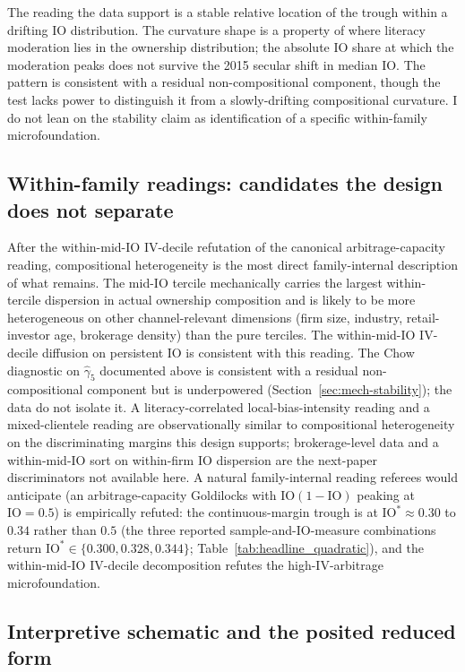 The reading the data support is a stable relative location of the trough within a drifting IO distribution. The curvature shape is a property of where literacy moderation lies in the ownership distribution; the absolute IO share at which the moderation peaks does not survive the 2015 secular shift in median IO. The pattern is consistent with a residual non-compositional component, though the test lacks power to distinguish it from a slowly-drifting compositional curvature. I do not lean on the stability claim as identification of a specific within-family microfoundation.

\subsection{Within-family readings: candidates the design does not separate}
\label{sec:mech-readings}

After the within-mid-IO IV-decile refutation of the canonical arbitrage-capacity reading, compositional heterogeneity is the most direct family-internal description of what remains. The mid-IO tercile mechanically carries the largest within-tercile dispersion in actual ownership composition and is likely to be more heterogeneous on other channel-relevant dimensions (firm size, industry, retail-investor age, brokerage density) than the pure terciles. The within-mid-IO IV-decile diffusion on persistent IO is consistent with this reading. The Chow diagnostic on $\hat\gamma_{5}$ documented above is consistent with a residual non-compositional component but is underpowered (Section~\ref{sec:mech-stability}); the data do not isolate it. A literacy-correlated local-bias-intensity reading and a mixed-clientele reading are observationally similar to compositional heterogeneity on the discriminating margins this design supports; brokerage-level data and a within-mid-IO sort on within-firm IO dispersion are the next-paper discriminators not available here. A natural family-internal reading referees would anticipate (an arbitrage-capacity Goldilocks with $\mathrm{IO}(1-\mathrm{IO})$ peaking at $\mathrm{IO} = 0.5$) is empirically refuted: the continuous-margin trough is at $\mathrm{IO}^{\ast} \approx 0.30$ to $0.34$ rather than $0.5$ (the three reported sample-and-IO-measure combinations return $\mathrm{IO}^{\ast} \in \{0.300, 0.328, 0.344\}$; Table~\ref{tab:headline_quadratic}), and the within-mid-IO IV-decile decomposition refutes the high-IV-arbitrage microfoundation.

\subsection{Interpretive schematic and the posited reduced form}

